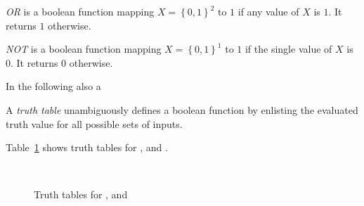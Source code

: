 \begin{defi}
  \emph{OR} is a boolean function mapping $X = \left\{0,1\right\}^2$
  to $1$ if any value of $X$ is $1$. It returns $1$ otherwise.
\end{defi}

\begin{defi}
  \emph{NOT} is a boolean function mapping $X = \left\{0,1\right\}^1$
  to $1$ if the single value of $X$ is $0$. It returns $0$ otherwise.
\end{defi}

In the following also a

\begin{defi}
  A \emph{truth table} unambiguously defines a boolean function
  by enlisting the evaluated truth value for all possible sets of
  inputs.

  Table~\ref{tab:andornot-truthtables} shows truth tables for
  ,  and .
\end{defi}

\begin{figure}[!t]
  \centering
  ~
  ~
  \label{tab:andornot-truthtables}
  \caption{Truth tables for ,  and }
\end{figure}

